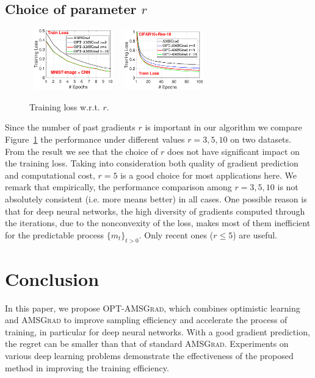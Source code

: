 \documentclass[11pt]{article}
\theoremstyle{k}
\begin{document}
\subsection{Choice of parameter $r$}\label{sec:choicer}
\begin{figure}\vspace{-0.4in}
\begin{center}
\mbox{
\includegraphics[width=1.35in]{new_figure/new_mnist_img_figure/mnist_img_train_loss_r3510_2.eps}\vspace{-0.5in}
}
\mbox{
\includegraphics[width=1.35in]{new_figure/cifar10_train_loss_r3510.eps}
}
\end{center}
\caption{Training loss w.r.t. $r$.}\label{fig:compare}
\end{figure}
\vspace{-0.1in}
Since the number of past gradients $r$ is important in our algorithm we compare Figure~\ref{fig:compare} the performance under different values $r=3,5,10$ on two datasets. 
From the result we see that the choice of $r$ does not have significant impact on the training loss.
Taking into consideration both quality of gradient prediction and computational cost, $r=5$ is a good choice for most applications here. 
We remark that empirically, the performance comparison among $r=3,5,10$ is not absolutely consistent (i.e. more means better) in all cases. 
One possible reason is that for deep neural networks, the high diversity of gradients computed through the iterations, due to the nonconvexity of the loss, makes most of them inefficient for the predictable process $\{m_t\}_{t>0}$. Only recent ones ($r \leq 5$) are useful.
\section{Conclusion}
In this paper, we propose \textsc{OPT-AMSGrad}, which combines optimistic learning and \textsc{AMSGrad} to improve sampling efficiency and
accelerate the process of training, in particular for deep neural networks. With a good gradient prediction, the regret can be smaller than that of standard \textsc{AMSGrad}. Experiments on various deep learning problems demonstrate the effectiveness of the proposed method in improving the training efficiency. 
\end{document}
